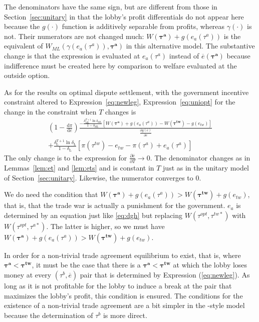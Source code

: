 \documentclass[authoryear, review]{elsarticle}
\newcommand{\ov}{\overline}
\newcommand{\bta}{\bm{\tau^a}}
\newcommand{\ga}{\gamma}
\newcommand{\btw}{\bm{\tau^{tw}}}
\newcommand{\de}{\delta}
\begin{document}
The denominators have the same sign, but are different from those in Section~\ref{sec:unitary} in that the lobby's profit differentials do not appear here because the $g(\cdot)$ function is additively separable from profits, whereas $\ga(\cdot)$ is not. Their numerators are not changed much: $W(\bta) + g(e_a(\tau^a))$ is the equivalent of $W_{ML}(\ga(e_a(\tau^a)),\bta)$ in this alternative model. The substantive change is that the expression is evaluated at $e_a(\tau^a)$ instead of $\ov{e}(\bta)$ because indifference must be created here by comparison to welfare evaluated at the outside option. 

As for the results on optimal dispute settlement, with the government incentive constraint altered to Expression~\ref{eq:newleg}, Expression~\ref{eq:uniopt} for the change in the constraint when $T$ changes is 
	\begin{multline}
		\left(1 - \frac{\mathrm{d} \pi}{\mathrm{d} \ov{e}} \right) \frac{ -\frac{\de_\text{ML}^{T+1}\ln\de_\text{ML}}{1-\de_\text{ML}}\left[  W(\bta) +g(e_a(\tau^a)) - W(\btw) - g(e_{tw}) \right]}{ \frac{\partial g(\ov{e})}{\partial e} } \\
	+  \frac{\de_\text{L}^{T+1} \ln \de_\text{L}}{1-\de_\text{L}} \left[ \pi(\tau^{tw}) - e_{tw} -\pi(\tau^a) + e_a(\tau^a) \right]
	\end{multline}
The only change is to the expression for $\frac{\partial \ov{e}}{\partial T} \rightarrow 0$. The denominator changes as in Lemmas~\ref{lem:et} and \ref{lem:ets} and is constant in $T$ just as in the unitary model of Section~\ref{sec:unitary}. Likewise, the numerator converges to $0$.

We do need the condition that $W(\bta) +g(e_a(\tau^a)) > W(\btw) + g(e_{tw})$, that is, that the trade war is actually a punishment for the government. $e_a$ is determined by an equation just like \ref{eq:dgh} but replacing $W(\tau^{opt},\tau^{tw*})$ with $W(\tau^{opt},\tau^{a*})$. The latter is higher, so we must have $W(\bta) +g(e_a(\tau^a)) > W(\btw) + g(e_{tw})$.

In order for a non-trivial trade agreement equilibrium to exist, that is, where $\bta < \btw$, it must be the case that there is a $\bta < \btw$ at which the lobby loses money at every $\left(\tau^b,\ov{e}\right)$ pair that is determined by Expression (\ref{eq:newleg}). As long as it is not profitable for the lobby to induce a break at the pair that maximizes the lobby's profit, this condition is ensured. The conditions for the existence of a non-trivial trade agreement are a bit simpler in the \citet{dgh97}-style model because the determination of $\tau^b$ is more direct.
\end{document}
